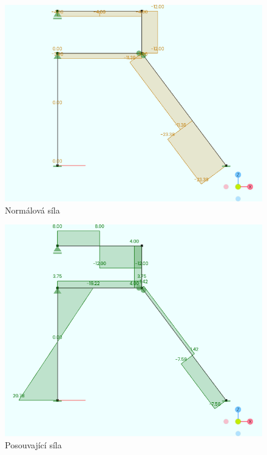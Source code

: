 \begin{figure}[H]
    \includegraphics{assets/figures/wbapp/example/axial_force.png}
    \caption{Normálová síla}
    \label{fig:wb_app_example_axial}
\end{figure}

\begin{figure}[H]
    \includegraphics{assets/figures/wbapp/example/shear_force.png}
    \caption{Posouvající síla}
    \label{fig:wb_app_example_shear}
\end{figure}

